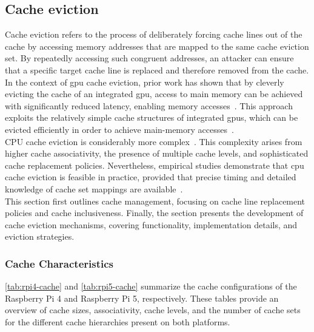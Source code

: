 \subsection{Cache eviction} \label{subsec:cache-eviction}
    Cache eviction refers to the process of deliberately forcing cache lines out of the cache by accessing 
    memory addresses that are mapped to the same cache eviction set. By repeatedly accessing such congruent 
    addresses, an attacker can ensure that a specific target cache line is replaced and 
    therefore removed from the cache.
    \\
    In the context of \gls{gpu} cache eviction, prior work has shown that by cleverly evicting the cache of an 
    integrated \gls{gpu}, access to main memory can be achieved with significantly reduced latency, enabling 
    memory accesses~\cite{paperPwning,paperTriggeringRHHardwareFault}. This approach exploits the relatively simple cache structures 
    of integrated \gls{gpu}s, which can be evicted efficiently in order to achieve main-memory accesses~\cite{paperOpenGL, thesisDRAMA, paperPwning}.
    \\
    CPU cache eviction is considerably more complex~\cite{paperARMageddon}. This complexity arises from higher cache associativity, 
    the presence of multiple cache levels, and sophisticated cache replacement policies. Nevertheless, 
    empirical studies demonstrate that \gls{cpu} cache eviction is feasible in practice, provided that precise 
    timing and detailed knowledge of cache set mappings are available~\cite{thesisCacheAttacksandRH, toolRPI3}.
    \\
    This section first outlines cache management, 
    focusing on cache line replacement policies and cache inclusiveness. Finally, the section presents the 
    development of cache eviction mechanisms, covering functionality, implementation details, and eviction 
    strategies.

    \subsubsection{Cache Characteristics} \label{subsubsec:cache-characteristics}
        \cref{tab:rpi4-cache} and \cref{tab:rpi5-cache} summarize the cache configurations of the Raspberry 
        Pi 4 and Raspberry Pi 5, respectively. These tables provide 
        an overview of cache sizes, associativity, cache levels, and the number of cache sets for the different 
        cache hierarchies present on both platforms.

